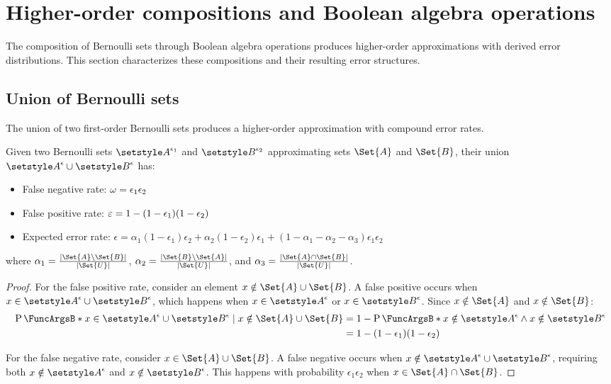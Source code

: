 \documentclass[ ../main.tex]{subfiles}
\begin{document}
\section{Higher-order compositions and Boolean algebra operations}
\label{sec:higher_order_compositions}

The composition of Bernoulli sets through Boolean algebra operations produces higher-order approximations with derived error distributions. This section characterizes these compositions and their resulting error structures.

\subsection{Union of Bernoulli sets}

The union of two first-order Bernoulli sets produces a higher-order approximation with compound error rates.

\begin{theorem}
\label{thm:union_error}
Given two Bernoulli sets $\ASetFO{A}[\epsilon_1]$ and $\ASetFO{B}[\epsilon_2]$ approximating sets $\Set{A}$ and $\Set{B}$, their union $\ASetFO{A} \cup \ASetFO{B}$ has:
\begin{itemize}
\item False negative rate: $\omega = \epsilon_1 \epsilon_2$
\item False positive rate: $\varepsilon = 1 - (1-\epsilon_1)(1-\epsilon_2)$
\item Expected error rate: $\epsilon = \alpha_1(1-\epsilon_1)\epsilon_2 + \alpha_2(1-\epsilon_2)\epsilon_1 + (1-\alpha_1-\alpha_2-\alpha_3)\epsilon_1\epsilon_2$
\end{itemize}
where $\alpha_1 = \frac{|\Set{A} \setminus \Set{B}|}{|\Set{U}|}$, $\alpha_2 = \frac{|\Set{B} \setminus \Set{A}|}{|\Set{U}|}$, and $\alpha_3 = \frac{|\Set{A} \cap \Set{B}|}{|\Set{U}|}$.
\end{theorem}

\begin{proof}
For the false positive rate, consider an element $x \notin \Set{A} \cup \Set{B}$. A false positive occurs when $x \in \ASetFO{A} \cup \ASetFO{B}$, which happens when $x \in \ASetFO{A}$ or $x \in \ASetFO{B}$. Since $x \notin \Set{A}$ and $x \notin \Set{B}$:
\begin{align}
\Prob{x \in \ASetFO{A} \cup \ASetFO{B} \mid x \notin \Set{A} \cup \Set{B}} &= 1 - \Prob{x \notin \ASetFO{A} \land x \notin \ASetFO{B}}\\
&= 1 - (1-\epsilon_1)(1-\epsilon_2)
\end{align}

For the false negative rate, consider $x \in \Set{A} \cup \Set{B}$. A false negative occurs when $x \notin \ASetFO{A} \cup \ASetFO{B}$, requiring both $x \notin \ASetFO{A}$ and $x \notin \ASetFO{B}$. This happens with probability $\epsilon_1 \epsilon_2$ when $x \in \Set{A} \cap \Set{B}$.
\end{proof}
\end{document}
